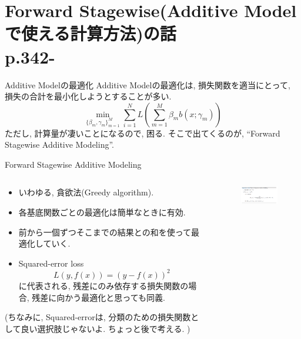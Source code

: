 \documentclass[dvipdfmx,8pt]{beamer}
\begin{document}
  \section{Forward Stagewise(Additive Modelで使える計算方法)の話\\p.342-}
  \begin{frame}{Additive Modelの最適化}
    Additive Modelの最適化は, 損失関数を適当にとって, 損失の合計を最小化しようとすることが多い.
    \[
      \min_{\{\beta_{m},\gamma_{m}\}_{m=1}^{M}}\sum_{i=1}^{N}L\left ( \sum_{m=1}^{M}\beta_{m}b(x; \gamma_{m}) \right )
    \]
    ただし, 計算量が凄いことになるので, 困る. そこで出てくるのが, ``Forward Stagewise Additive Modeling''.
  \end{frame}
  \begin{frame}{Forward Stagewise Additive Modeling}
    \begin{columns}[t]
      \begin{column}{0.5\linewidth}
        \begin{itemize}
          \item いわゆる, 貪欲法(Greedy algorithm).
          \item 各基底関数ごとの最適化は簡単なときに有効.
          \item 前から一個ずつそこまでの結果との和を使って最適化していく.
          \item Squared-error loss
            \[
              L(y,f(x))=(y-f(x))^{2}
            \]
            に代表される, 残差にのみ依存する損失関数の場合, 残差に向かう最適化と思っても同義.
        \end{itemize}
        (ちなみに, Squared-errorは, 分類のための損失関数として良い選択肢じゃないよ. ちょっと後で考える. )
      \end{column}
      \begin{column}{0.5\linewidth}
        \begin{figure}[htb]
          \centering
          \includegraphics[width=5cm,clip]{images/ForwardStagewise.png}
        \end{figure}
      \end{column}
    \end{columns}
  \end{frame}
\end{document}
